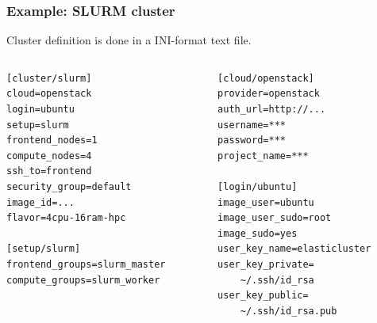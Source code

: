 \documentclass[english,serif,mathserif,usenames,dvipsnames]{beamer}
\begin{document}
\begin{frame}[fragile]
  \frametitle{Example: SLURM cluster}

    Cluster definition is done in a INI-format text file.

    \begin{columns}
      \begin{column}{0.5\linewidth}
        \footnotesize
\begin{lstlisting}
[cluster/slurm]
cloud=openstack
login=ubuntu
setup=slurm
frontend_nodes=1
compute_nodes=4
ssh_to=frontend
security_group=default
image_id=...
flavor=4cpu-16ram-hpc

[setup/slurm]
frontend_groups=slurm_master
compute_groups=slurm_worker
\end{lstlisting}
      \end{column}
      \begin{column}{0.5\linewidth}
        \footnotesize
\begin{lstlisting}
[cloud/openstack]
provider=openstack
auth_url=http://...
username=***
password=***
project_name=***

[login/ubuntu]
image_user=ubuntu
image_user_sudo=root
image_sudo=yes
user_key_name=elasticluster
user_key_private=
    ~/.ssh/id_rsa
user_key_public=
    ~/.ssh/id_rsa.pub
\end{lstlisting}
      \end{column}
    \end{columns}

\end{frame}
\end{document}
